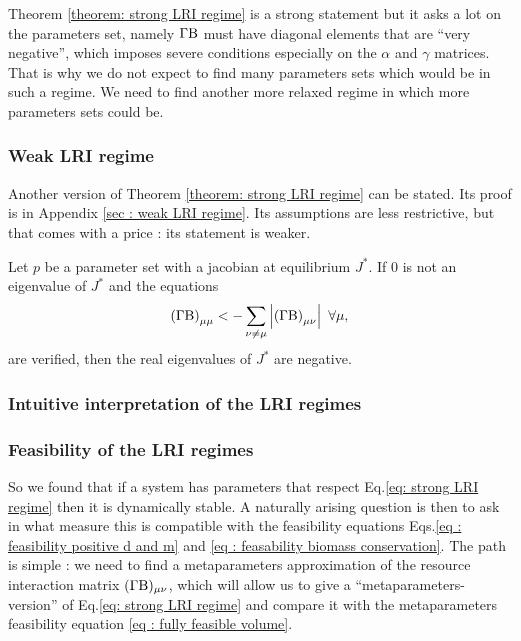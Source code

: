 \documentclass[12pt, titlepage]{report}
\begin{document}
\noindent Theorem \ref{theorem: strong LRI regime} is a strong statement but it asks a lot on the parameters set, namely $\Gamma\text{B}$ must have diagonal elements that are ``very negative'', which imposes severe conditions especially on the $\alpha$ and $\gamma$ matrices. That is why we do not expect to find many parameters sets which would be in such a regime. We need to find another more relaxed regime in which more parameters sets could be.
\subsubsection{Weak LRI regime}
Another version of Theorem \ref{theorem: strong LRI regime} can be stated. Its proof is in Appendix \ref{sec : weak LRI regime}. Its assumptions are less restrictive, but that comes with a price : its statement is weaker.
\begin{theorem}\label{theorem: weak LRI regime}
Let $p$ be a parameter set with a jacobian at equilibrium $J^*$. If $0$ is not an eigenvalue of $J^*$ and the equations
\begin{equation}
\left(\Gamma \text{B}\right)_{\mu\mu} < - \sum_{\nu \neq \mu } \left|{\left(\Gamma \text{B}\right)_{\mu \nu}}\right| \ \forall \mu,
\end{equation}
are verified, then the real eigenvalues of $J^*$ are negative.
\end{theorem}

\subsubsection{Intuitive interpretation of the LRI regimes}



\subsubsection{Feasibility of the LRI regimes}
So we found that if a system has parameters that respect Eq.\eqref{eq: strong LRI regime} then it is dynamically stable. A naturally arising question is then to ask in what measure this is compatible with the feasibility equations Eqs.\eqref{eq : feasibility positive d and m} and \eqref{eq : feasability biomass conservation}.
The path is simple : we need to find a metaparameters approximation of the resource interaction matrix $(\Gamma\text{B})_{\mu \nu}$, which will allow us to give a ``metaparameters-version'' of Eq.\eqref{eq: strong LRI regime} and compare it with the metaparameters feasibility equation \eqref{eq : fully feasible volume}.
\end{document}
